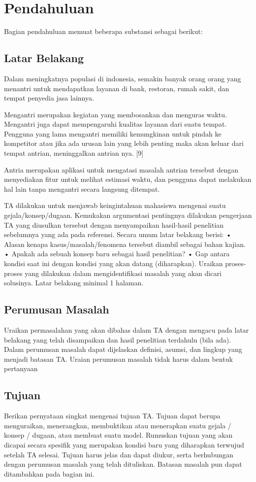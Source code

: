 \chapter{Pendahuluan}
Bagian pendahuluan memuat beberapa substansi sebagai berikut:

\section{Latar Belakang}
Dalam meningkatnya populasi di indonesia, semakin banyak orang orang yang menantri untuk mendapatkan layanan di bank, restoran, rumah sakit, dan tempat penyedia jasa lainnya. 

Mengantri merupakan kegiatan yang membosankan dan menguras waktu. Mengantri juga dapat mempengaruhi kualitas layanan dari suatu tempat. Pengguna yang lama mengantri memiliki kemungkinan untuk pindah ke kompetitor atau jika ada urusan lain yang lebih penting maka akan keluar dari tempat antrian, meninggalkan antrian nya. [9]

Antria merupakan aplikasi untuk mengatasi masalah antrian tersebut dengan menyediakan fitur untuk melihat estimasi waktu, dan pengguna dapat melakukan hal lain tanpa mengantri secara langsung ditempat.

TA dilakukan untuk menjawab keingintahuan mahasiswa mengenai suatu gejala/konsep/dugaan. Kemukakan argumentasi pentingnya dilakukan pengerjaan TA yang diusulkan tersebut dengan menyampaikan hasil-hasil penelitian sebelumnya yang ada pada referensi. Secara umum latar belakang berisi:
• Alasan kenapa kasus/masalah/fenomena tersebut diambil sebagai bahan kajian.
• Apakah ada sebuah konsep baru sebagai hasil penelitian?
• Gap antara kondisi saat ini dengan kondisi yang akan datang (diharapkan).
Uraikan proses-proses yang dilakukan dalam mengidentifikasi masalah yang akan dicari solusinya. Latar belakang minimal 1 halaman.

\section{Perumusan Masalah}
Uraikan permasalahan yang akan dibahas dalam TA dengan mengacu pada latar belakang yang telah disampaikan dan hasil penelitian terdahulu (bila ada). Dalam perumusan masalah dapat dijelaskan definisi, asumsi, dan lingkup yang menjadi batasan TA. Uraian perumusan masalah tidak harus dalam bentuk pertanyaan

\section{Tujuan}
Berikan pernyataan singkat mengenai tujuan TA. Tujuan dapat berupa menguraikan, menerangkan, membuktikan atau menerapkan suatu gejala / konsep / dugaan, atau membuat suatu model. Rumuskan tujuan yang akan dicapai secara spesifik yang merupakan kondisi baru yang diharapkan terwujud setelah TA selesai. Tujuan harus jelas dan dapat diukur, serta berhubungan dengan perumusan masalah yang telah dituliskan. Batasan masalah pun dapat ditambahkan pada bagian ini.


